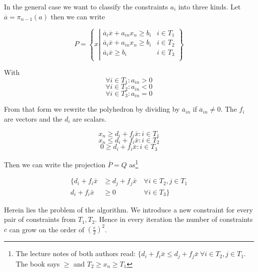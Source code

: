 In the general case we want to classify the constraints $a_i$ into three kinds. Let $\overline a = \pi_{n-1}(a)$ then we can write  

\[P=\left\{x\left| \begin{array}{cr}
\overline a_i\overline x +a_{in}x_n \geq b_i & i\in T_1\\
\overline a_i\overline x +a_{in}x_n \geq b_i & i\in T_2\\
\overline a_i\overline x \geq b_i & i\in T_3\\
\end{array}\right.\right\}\]

With 
$$\forall i\in T_1: a_{in}>0$$ $$\forall i\in T_2: a_{in}<0$$ $$ \forall i\in T_3: a_{in}=0 $$

From that form we rewrite the polyhedron by dividing by $\overline a_{in}$ if $\overline a_{in}\neq 0$. The $f_i$ are vectors and the $d_i$ are scalars. 

\begin{equation}\label{For:Motz1}x_n \geq  d_i + f_i \bar x : i \in T_1 \end{equation}
\begin{equation}\label{For:Motz2}x_n \leq  d_i+f_i \bar x : i \in T_2 \end{equation}
\begin{equation}\label{For:Motz3}0 \geq  d_i+f_i \bar x : i \in T_3 \end{equation}


Then we can write the projection $\overline P=Q$ as\footnote{The lecture notes of both authors read: $\{d_i+f_i\bar x \leq d_j+f_j\bar x\ \forall i\in T_2, j\in T_1 $. The book says $\geq$ and $T_2\geq x_n \geq T_1$}

\begin{eqnarray*}
\{d_i+f_i\bar x & \geq d_j+f_j\bar x\ & \forall i\in T_2, j\in T_1  \\
d_i+f_i\bar x & \geq 0\ & \forall i\in T_3\}
\end{eqnarray*}


Herein lies the problem of the algorithm. We introduce a new constraint for every pair of constraints from $T_1,T_2$. Hence in every iteration the number of constraints $c$ can grow on the order of $(\frac{c}{2})^2$.

